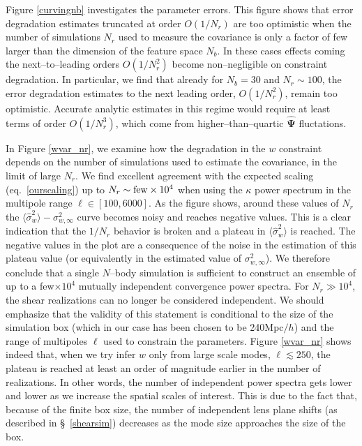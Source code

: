 \documentclass[reprint,aps,prd,superscriptaddress,showkeys,showpacs]{revtex4-1}
\newcommand{\bbh}[1]{\mathbf{\hat{#1}}}
\begin{document}
Figure \ref{curvingnb} investigates the parameter errors. This figure
shows that error degradation estimates truncated at order $O(1/N_r)$
are too optimistic when the number of simulations $N_r$ used to
measure the covariance is only a factor of few larger than the
dimension of the feature space $N_b$. In these cases effects coming
the next--to--leading orders $O(1/N_r^2)$ become non--negligible on
constraint degradation. In particular, we find that already for
$N_b=30$ and $N_r\sim100$, the error degradation estimates to the next
leading order, $O(1/N_r^2)$, remain too optimistic. Accurate analytic
estimates in this regime would require at least terms of order
$O(1/N_r^3)$, which come from higher--than--quartic $\bbh{\Psi}$
fluctations.

In Figure \ref{wvar_nr}, we examine how the degradation in the $w$
constraint depends on the number of simulations used to estimate the
covariance, in the limit of large $N_r$. We find excellent agreement
with the expected scaling (eq.~\ref{ourscaling}) up to $N_r\sim {\rm few}\times10^4$ when using the $\kappa$ power spectrum in the multipole range $\ell\in[100,6000]$. As the figure shows, around these values of $N_r$ the $\langle\hat{\sigma}^2_w\rangle - \sigma^2_{w,\infty}$ curve
becomes noisy and reaches negative values. This is a clear indication that the $1/N_r$ behavior is broken and a plateau in
$\langle\hat{\sigma}^2_w\rangle$ is reached. The negative values in
the plot are a consequence of the noise in the estimation of this
plateau value (or equivalently in the estimated value of
$\sigma^2_{w,\infty}$). We therefore conclude that a single $N$--body
simulation is sufficient to construct an ensemble of up to a
few$\times 10^4$ mutually independent convergence power spectra. For
$N_r\gg10^4$, the shear realizations can no longer be considered
independent. We should emphasize that the validity of this statement is conditional to the size of the simulation box (which in our case has been chosen to be 240Mpc$/h$) and the range of multipoles $\ell$ used to constrain the parameters. Figure \ref{wvar_nr} shows indeed that, when we try infer $w$ only from large scale modes, $\ell\lesssim250$, the plateau is reached at least an order of magnitude earlier in the number of realizations. In other words, the number of independent power spectra gets lower and lower as we increase the spatial scales of interest. This is due to the fact that, because of the finite box size, the number of independent lens plane shifts (as described in \S~\ref{shearsim}) decreases as the mode size approaches the size of the box.       
\end{document}
